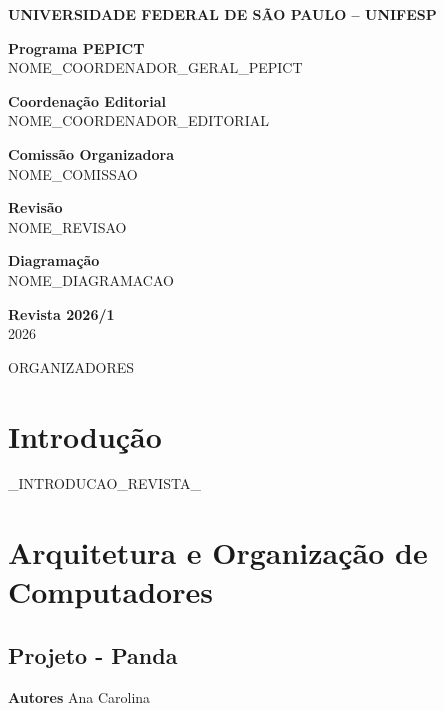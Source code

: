 \documentclass[12pt,openright,oneside,a4paper]{report}
\begin{document}
\begin{flushleft}
{\large \textbf{UNIVERSIDADE FEDERAL DE SÃO PAULO – UNIFESP}}
\vspace{1cm}

\textbf{Programa PEPICT} \\
NOME_COORDENADOR_GERAL_PEPICT
\vspace{0.7cm}

\textbf{Coordenação Editorial} \\
NOME_COORDENADOR_EDITORIAL
\vspace{0.7cm}

\textbf{Comissão Organizadora} \\
NOME_COMISSAO
\vspace{0.7cm}

\textbf{Revisão} \\
NOME_REVISAO
\vspace{0.7cm}

\textbf{Diagramação} \\
NOME_DIAGRAMACAO
\vspace{1.5cm}

\textbf{\large Revista 2026/1} \\
2026
\vspace{0.5cm}

ORGANIZADORES
\end{flushleft}
\clearpage

\tableofcontents
\clearpage

\chapter{Introdução}
_INTRODUCAO_REVISTA_
\clearpage

\chapter{Arquitetura e Organização de Computadores}

\section{Projeto - Panda}
\noindent
\textbf{Autores}
Ana Carolina
\end{document}
